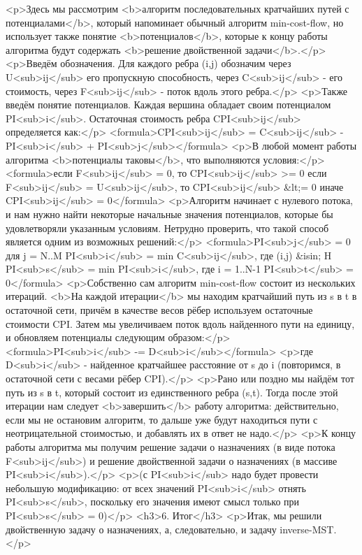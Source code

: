 <p>Здесь мы рассмотрим <b>алгоритм последовательных кратчайших путей с потенциалами</b>, который напоминает обычный алгоритм min-cost-flow, но использует также понятие <b>потенциалов</b>, которые к концу работы алгоритма будут содержать <b>решение двойственной задачи</b>.</p>
<p>Введём обозначения. Для каждого ребра (i,j) обозначим через U<sub>ij</sub> его пропускную способность, через C<sub>ij</sub> - его стоимость, через F<sub>ij</sub> - поток вдоль этого ребра.</p>
<p>Также введём понятие потенциалов. Каждая вершина обладает своим потенциалом PI<sub>i</sub>. Остаточная стоимость ребра CPI<sub>ij</sub> определяется как:</p>
<formula>CPI<sub>ij</sub> = C<sub>ij</sub> - PI<sub>i</sub> + PI<sub>j</sub></formula>
<p>В любой момент работы алгоритма <b>потенциалы таковы</b>, что выполняются условия:</p>
<formula>если F<sub>ij</sub> = 0, то CPI<sub>ij</sub> >= 0
если F<sub>ij</sub> = U<sub>ij</sub>, то CPI<sub>ij</sub> &lt;= 0
иначе CPI<sub>ij</sub> = 0</formula>
<p>Алгоритм начинает с нулевого потока, и нам нужно найти некоторые начальные значения потенциалов, которые бы удовлетворяли указанным условиям. Нетрудно проверить, что такой способ является одним из возможных решений:</p>
<formula>PI<sub>j</sub> = 0   для j = N..M
PI<sub>i</sub> = min C<sub>ij</sub>, где (i,j) &isin; H
PI<sub>s</sub> = min PI<sub>i</sub>, где i = 1..N-1
PI<sub>t</sub> = 0</formula>
<p>Собственно сам алгоритм min-cost-flow состоит из нескольких итераций. <b>На каждой итерации</b> мы находим кратчайший путь из s в t в остаточной сети, причём в качестве весов рёбер используем остаточные стоимости CPI. Затем мы увеличиваем поток вдоль найденного пути на единицу, и обновляем потенциалы следующим образом:</p>
<formula>PI<sub>i</sub> -= D<sub>i</sub></formula>
<p>где D<sub>i</sub> - найденное кратчайшее расстояние от s до i (повторимся, в остаточной сети с весами рёбер CPI).</p>
<p>Рано или поздно мы найдём тот путь из s в t, который состоит из единственного ребра (s,t). Тогда после этой итерации нам следует <b>завершить</b> работу алгоритма: действительно, если мы не остановим алгоритм, то дальше уже будут находиться пути с неотрицательной стоимостью, и добавлять их в ответ не надо.</p>
<p>К концу работы алгоритма мы получим решение задачи о назначениях (в виде потока F<sub>ij</sub>) и решение двойственной задачи о назначениях (в массиве PI<sub>i</sub>).</p>
<p>(с PI<sub>i</sub> надо будет провести небольшую модификацию: от всех значений PI<sub>i</sub> отнять PI<sub>s</sub>, поскольку его значения имеют смысл только при PI<sub>s</sub> = 0)</p>
<h3>6. Итог</h3>
<p>Итак, мы решили двойственную задачу о назначениях, а, следовательно, и задачу inverse-MST.</p>
